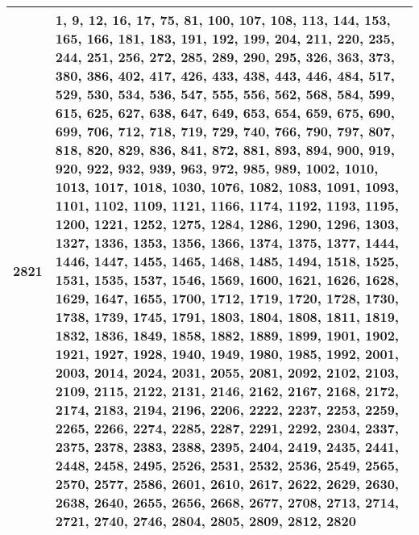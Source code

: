 \documentclass[12pt]{article}
\begin{document}
\begin{tabular}{|c|p{16cm}|}
    2821 & \scriptsize{1, 9, 12, 16, 17, 75, 81, 100, 107, 108, 113, 144, 153, 165, 166, 181, 183, 191, 192, 199, 204, 211, 220, 235, 244, 251, 256, 272, 285, 289, 290, 295, 326, 363, 373, 380, 386, 402, 417, 426, 433, 438, 443, 446, 484, 517, 529, 530, 534, 536, 547, 555, 556, 562, 568, 584, 599, 615, 625, 627, 638, 647, 649, 653, 654, 659, 675, 690, 699, 706, 712, 718, 719, 729, 740, 766, 790, 797, 807, 818, 820, 829, 836, 841, 872, 881, 893, 894, 900, 919, 920, 922, 932, 939, 963, 972, 985, 989, 1002, 1010, 1013, 1017, 1018, 1030, 1076, 1082, 1083, 1091, 1093, 1101, 1102, 1109, 1121, 1166, 1174, 1192, 1193, 1195, 1200, 1221, 1252, 1275, 1284, 1286, 1290, 1296, 1303, 1327, 1336, 1353, 1356, 1366, 1374, 1375, 1377, 1444, 1446, 1447, 1455, 1465, 1468, 1485, 1494, 1518, 1525, 1531, 1535, 1537, 1546, 1569, 1600, 1621, 1626, 1628, 1629, 1647, 1655, 1700, 1712, 1719, 1720, 1728, 1730, 1738, 1739, 1745, 1791, 1803, 1804, 1808, 1811, 1819, 1832, 1836, 1849, 1858, 1882, 1889, 1899, 1901, 1902, 1921, 1927, 1928, 1940, 1949, 1980, 1985, 1992, 2001, 2003, 2014, 2024, 2031, 2055, 2081, 2092, 2102, 2103, 2109, 2115, 2122, 2131, 2146, 2162, 2167, 2168, 2172, 2174, 2183, 2194, 2196, 2206, 2222, 2237, 2253, 2259, 2265, 2266, 2274, 2285, 2287, 2291, 2292, 2304, 2337, 2375, 2378, 2383, 2388, 2395, 2404, 2419, 2435, 2441, 2448, 2458, 2495, 2526, 2531, 2532, 2536, 2549, 2565, 2570, 2577, 2586, 2601, 2610, 2617, 2622, 2629, 2630, 2638, 2640, 2655, 2656, 2668, 2677, 2708, 2713, 2714, 2721, 2740, 2746, 2804, 2805, 2809, 2812, 2820} \\
    \hline

\end{tabular}
\end{document}
